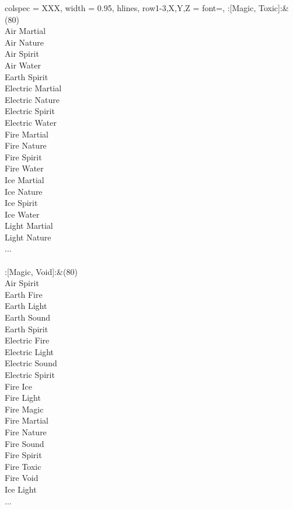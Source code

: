 \begin{longtblr}[
	caption = {2v2 Attacking Effective},
	label = {2v2-Attacking-Effective},
]{
	colspec = {XXX}, width = 0.95\linewidth,
	hlines,
	row{1-3,X,Y,Z} = {font=\bfseries},
}
	:[Magic, Toxic]:&{(80)\\
	Air Martial \\
	Air Nature \\
	Air Spirit \\
	Air Water \\
	Earth Spirit \\
	Electric Martial \\
	Electric Nature \\
	Electric Spirit \\
	Electric Water \\
	Fire Martial \\
	Fire Nature \\
	Fire Spirit \\
	Fire Water \\
	Ice Martial \\
	Ice Nature \\
	Ice Spirit \\
	Ice Water \\
	Light Martial \\
	Light Nature \\
	...\\
	}\\

	:[Magic, Void]:&{(80)\\
	Air Spirit \\
	Earth Fire \\
	Earth Light \\
	Earth Sound \\
	Earth Spirit \\
	Electric Fire \\
	Electric Light \\
	Electric Sound \\
	Electric Spirit \\
	Fire Ice \\
	Fire Light \\
	Fire Magic \\
	Fire Martial \\
	Fire Nature \\
	Fire Sound \\
	Fire Spirit \\
	Fire Toxic \\
	Fire Void \\
	Ice Light \\
	...\\
	}\\


\end{longtblr}

